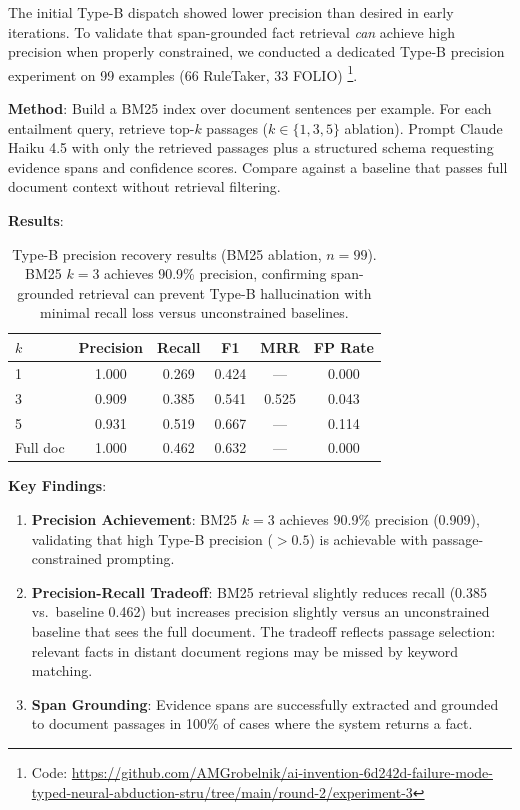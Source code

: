 \documentclass[11pt,letterpaper]{article}
\begin{document}
The initial Type-B dispatch showed lower precision than desired in early iterations. To validate that span-grounded fact retrieval \emph{can} achieve high precision when properly constrained, we conducted a dedicated Type-B precision experiment on 99 examples (66 RuleTaker, 33 FOLIO)%
\footnote{Code: \url{https://github.com/AMGrobelnik/ai-invention-6d242d-failure-mode-typed-neural-abduction-stru/tree/main/round-2/experiment-3}}.

\textbf{Method}: Build a BM25 index over document sentences per example. For each entailment query, retrieve top-$k$ passages ($k \in \{1, 3, 5\}$ ablation). Prompt Claude Haiku 4.5 with only the retrieved passages plus a structured schema requesting evidence spans and confidence scores. Compare against a baseline that passes full document context without retrieval filtering.

\textbf{Results}:

\begin{table}[!htbp]
  \centering
  \caption{Type-B precision recovery results (BM25 ablation, $n=99$). BM25 $k=3$ achieves 90.9\% precision, confirming span-grounded retrieval can prevent Type-B hallucination with minimal recall loss versus unconstrained baselines.}
  \label{tab:typeb}
  \begin{tabular}{lccccc}
    \toprule
    $k$ & Precision & Recall & F1    & MRR   & FP Rate \\
    \midrule
    1            & 1.000 & 0.269 & 0.424 & ---   & 0.000 \\
    3            & 0.909 & 0.385 & 0.541 & 0.525 & 0.043 \\
    5            & 0.931 & 0.519 & 0.667 & ---   & 0.114 \\
    Full doc     & 1.000 & 0.462 & 0.632 & ---   & 0.000 \\
    \bottomrule
  \end{tabular}
\end{table}

\textbf{Key Findings}:
\begin{enumerate}
  \item \textbf{Precision Achievement}: BM25 $k=3$ achieves 90.9\% precision (0.909), validating that high Type-B precision ($>0.5$) is achievable with passage-constrained prompting.
  \item \textbf{Precision-Recall Tradeoff}: BM25 retrieval slightly reduces recall (0.385 vs.\ baseline 0.462) but increases precision slightly versus an unconstrained baseline that sees the full document. The tradeoff reflects passage selection: relevant facts in distant document regions may be missed by keyword matching.
  \item \textbf{Span Grounding}: Evidence spans are successfully extracted and grounded to document passages in 100\% of cases where the system returns a fact.
\end{enumerate}
\end{document}
